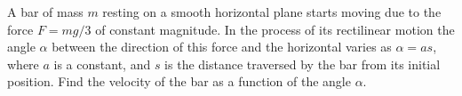 \item A bar of mass $m$ resting on a smooth horizontal plane starts moving due to the force $F = mg/3$ of constant magnitude. In the process of its rectilinear motion the angle $\alpha$ between the direction of this force and the horizontal varies as $\alpha = as$, where $a$ is a constant, and $s$ is the distance traversed by the bar from its initial position. Find the velocity of the bar as a function of the angle $\alpha$.